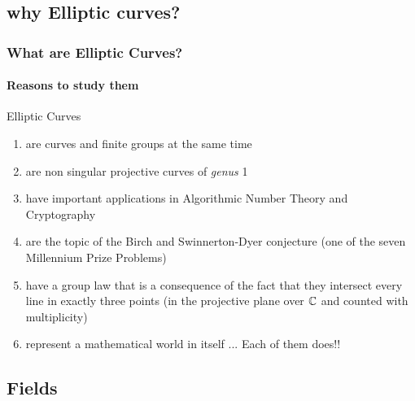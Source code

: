 \documentclass[10pt,handout]{beamer} %
\begin{document}
\begin{frame}
\begin{columns}[c]
\begin{column}{6cm}
\end{column}
\end{columns}
\end{frame}

\subsection{why Elliptic curves?}
\begin{frame}\frametitle{What are Elliptic Curves?}
\framesubtitle{Reasons to study them}\pause

Elliptic Curves
\begin{enumerate}[<+-| alert@+>]
\item are curves and finite groups at the same time
\item are non singular projective curves of \emph{genus} 1
\item have important applications in Algorithmic Number Theory and Cryptography
\item are the topic of the \alert{Birch and Swinnerton-Dyer conjecture} (one of the seven Millennium Prize Problems)
\item have a group law that is a consequence of the fact that they intersect every line in
exactly three points (in the projective plane over $\mathbb C$ and counted with multiplicity)
\item represent a mathematical world in itself ... Each of them does!!
\end{enumerate}
\end{frame}

\subsection{Fields}
\end{document}
